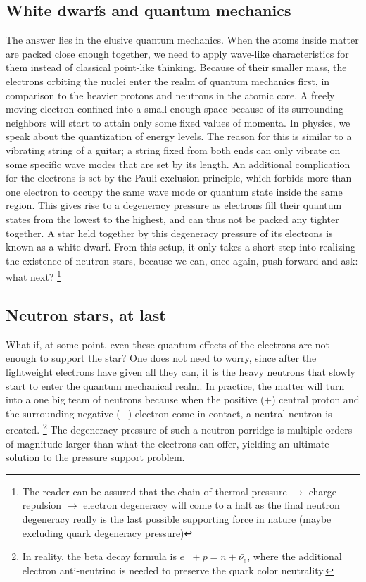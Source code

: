 \subsection{White dwarfs and quantum mechanics}
The answer lies in the elusive quantum mechanics.
When the atoms inside matter are packed close enough together, we need to apply wave-like characteristics for them instead of classical point-like thinking.
Because of their smaller mass, the electrons orbiting the nuclei enter the realm of quantum mechanics first, in comparison to the heavier protons and neutrons in the atomic core.
A freely moving electron confined into a small enough space because of its surrounding neighbors will start to attain only some fixed values of momenta.
In physics, we speak about the quantization of energy levels.
The reason for this is similar to a vibrating string of a guitar; a string fixed from both ends can only vibrate on some specific wave modes that are set by its length.
An additional complication for the electrons is set by the Pauli exclusion principle, which forbids more than one electron to occupy the same wave mode or quantum state inside the same region.
This gives rise to a degeneracy pressure as electrons fill their quantum states from the lowest to the highest, and can thus not be packed any tighter together.
A star held together by this degeneracy pressure of its electrons is known as a white dwarf.
From this setup, it only takes a short step into realizing the existence of neutron stars, because we can, once again, push forward and ask: what next?%
\footnote{The reader can be assured that the chain of thermal pressure $\rightarrow$ charge repulsion $\rightarrow$ electron degeneracy will come to a halt as the final neutron degeneracy really is the last possible supporting force in nature (maybe excluding quark degeneracy pressure)}


\subsection{Neutron stars, at last}
What if, at some point, even these quantum effects of the electrons are not enough to support the star?
One does not need to worry, since after the lightweight electrons have given all they can, it is the heavy neutrons that slowly start to enter the quantum mechanical realm.
In practice, the matter will turn into a one big team of neutrons because when the positive ($+$) central proton and the surrounding negative ($-$) electron come in contact, a neutral neutron is created.%
\footnote{In reality, the beta decay formula is $e^- + p = n + \bar{\nu_e}$, where the additional electron anti-neutrino is needed to preserve the quark color neutrality.}
The degeneracy pressure of such a neutron porridge is multiple orders of magnitude larger than what the electrons can offer, yielding an ultimate solution to the pressure support problem.

